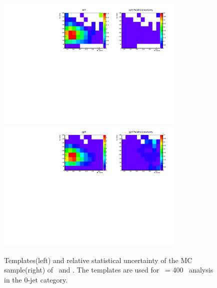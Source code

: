 % 
% 
\begin{figure}[htp]
\centering
\includegraphics[width=0.8\textwidth]{figures/2dtemplate_qqH_mH400_0j.pdf}
\includegraphics[width=0.8\textwidth]{figures/2dtemplate_ggH_mH400_0j.pdf}
\caption{Templates(left) and relative statistical uncertainty of the MC sample(right) 
of \qqH\ and \ggH. 
The templates are used for \mHi\ = 400 \GeV\ analysis in the 0-jet category.}
\label{fig:2dtemplate_400_0j_1}
\end{figure}

